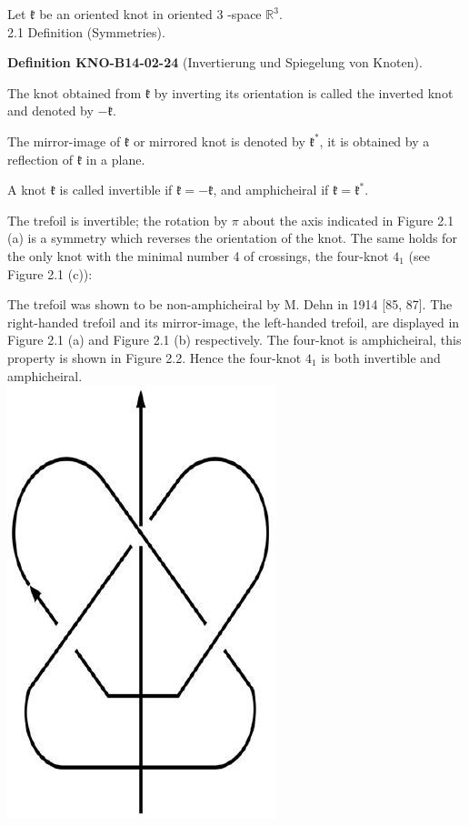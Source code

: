 \documentclass[10pt, letterpaper]{article}
\newcommand{\CustomHeading}[3]{%
  \par\medskip\noindent%
  \textbf{#1 #2} \textnormal{(#3)}.\enskip%
}
\newenvironment{DEF}[2]{\begin{unitbox}\CustomHeading{Definition}{#1}{#2}}{\end{unitbox}}
\begin{document}
Let $\mathfrak{k}$ be an oriented knot in oriented 3 -space $\mathbb{R}^{3}$.\\

2.1 Definition (Symmetries). 

\begin{DEF}{KNO-B14-02-24}{Invertierung und Spiegelung von Knoten}
The knot obtained from $\mathfrak{k}$ by inverting its orientation is called the inverted knot and denoted by $- \mathfrak{k}$. 

The mirror-image of $\mathfrak{k}$ or mirrored knot is denoted by $\mathfrak{k}^{*}$, it is obtained by a reflection of $\mathfrak{k}$ in a plane.

A knot $\mathfrak{k}$ is called invertible if $\mathfrak{k}=-\mathfrak{k}$, and amphicheiral if $\mathfrak{k}=\mathfrak{k}^{*}$.
\end{DEF}

The trefoil is invertible; the rotation by $\pi$ about the axis indicated in Figure 2.1 (a) is a symmetry which reverses the orientation of the knot. The same holds for the only knot with the minimal number 4 of crossings, the four-knot $4_{1}$ (see Figure 2.1 (c)):

The trefoil was shown to be non-amphicheiral by M. Dehn in 1914 [85, 87]. The right-handed trefoil and its mirror-image, the left-handed trefoil, are displayed in Figure 2.1 (a) and Figure 2.1 (b) respectively. The four-knot is amphicheiral, this property is shown in Figure 2.2. Hence the four-knot $4_{1}$ is both invertible and amphicheiral.\\
\includegraphics[scale=0.2, center]{2025_05_21_9c06be8de7a55410f8c1g-030}
\end{document}
